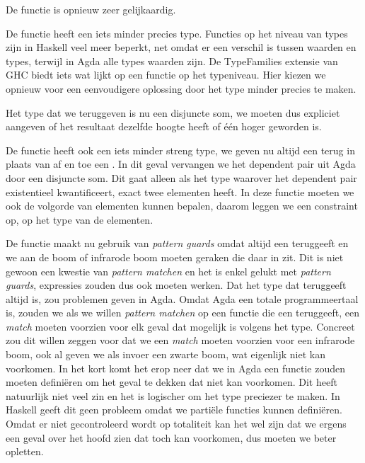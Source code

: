 De  functie is opnieuw zeer gelijkaardig.


De functie  heeft een iets minder precies type. Functies op het
niveau van types zijn in Haskell veel meer beperkt, net omdat er een verschil
is tussen waarden en types, terwijl in Agda alle types waarden zijn. De
TypeFamilies extensie \cite{typefam} van GHC biedt iets wat lijkt op een
functie op het typeniveau. Hier kiezen we opnieuw voor een eenvoudigere
oplossing door het type minder precies te maken.


Het type dat we teruggeven is nu een disjuncte som, we moeten dus
expliciet aangeven of het resultaat dezelfde hoogte heeft of één hoger geworden
is.

De  functie heeft ook een iets minder streng type, we geven nu
altijd een  terug in plaats van af en toe een . In
dit geval vervangen we het dependent pair uit Agda door een disjuncte
som. Dit gaat alleen als het type waarover het dependent pair
existentieel kwantificeert, exact twee elementen heeft. In deze functie moeten
we ook de volgorde van elementen kunnen bepalen, daarom leggen we een
 constraint op, op het type van de elementen.


De functie maakt nu gebruik van \emph{pattern guards} \cite{patguard} omdat
 altijd een  teruggeeft en we aan de boom of
infrarode boom moeten geraken die daar in zit. Dit is niet gewoon een kwestie
van \emph{pattern matchen} en het is enkel gelukt met \emph{pattern guards},
 expressies zouden dus ook moeten werken. Dat het type dat
 teruggeeft altijd  is, zou problemen geven in Agda.
Omdat Agda een totale programmeertaal is, zouden we als we willen \emph{pattern
matchen} op een functie die een  teruggeeft, een \emph{match} moeten
voorzien voor elk geval dat mogelijk is volgens het type. Concreet zou dit
willen zeggen voor  dat we een \emph{match} moeten voorzien voor een
infrarode boom, ook al geven we als invoer een zwarte boom, wat eigenlijk niet
kan voorkomen. In het kort komt het erop neer dat we in Agda een functie zouden
moeten definiëren om het geval te dekken dat niet kan voorkomen. Dit heeft
natuurlijk niet veel zin en het is logischer om het type preciezer te maken. In
Haskell geeft dit geen probleem omdat we partiële functies kunnen definiëren.
Omdat er niet gecontroleerd wordt op totaliteit kan het wel zijn dat we ergens
een geval over het hoofd zien dat toch kan voorkomen, dus moeten we beter
opletten.

